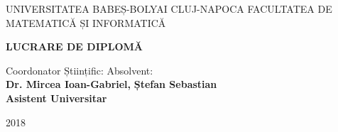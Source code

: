 \documentclass[12pt]{report}
\begin{document}
	
	\begin{titlepage}
		
		\begin{center}
			\Large{{UNIVERSITATEA BABEȘ-BOLYAI CLUJ-NAPOCA}}
			\Large{{FACULTATEA DE MATEMATICĂ ȘI INFORMATICĂ}}
			
			\vspace{8cm}
			
			\Huge\textbf{LUCRARE DE DIPLOMĂ}
			\fontsize{12}{14}
			
		\end{center}
		\vspace{6cm}
		
		\Large{Coordonator  Științific:} \hfill  \Large{Absolvent:} \hspace*{0.8cm} \\    
		\Large\textbf{Dr. Mircea Ioan-Gabriel,} \hfill  \Large\textbf{Ștefan Sebastian}\\
		\Large\textbf{Asistent Universitar}
		
		\vspace{2cm}
		\begin{center}
			\Large{2018}
		\end{center}
	\end{titlepage}
	
\end{document}
